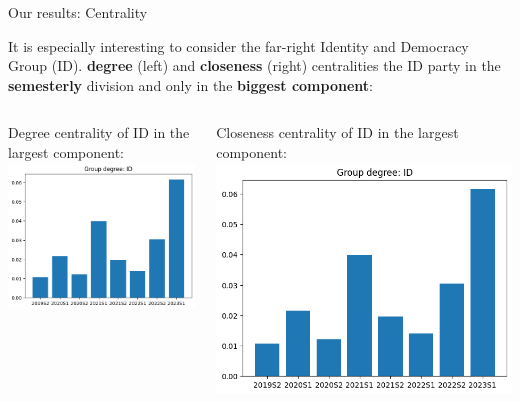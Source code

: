 \documentclass{beamer}
\begin{document}
\begin{frame}{Our results: Centrality}
	
	It is especially interesting to consider the far-right Identity and Democracy Group (ID).
	 \textbf{degree} (left) and \textbf{closeness} (right) centralities the ID party in the \textbf{semesterly} division and only in the \textbf{biggest component}:
	\vspace{4mm}
	\pause
	
\begin{columns}
	\begin{column}{0.5\textwidth}
	Degree centrality of ID in the largest component:
	\\
	\includegraphics[width=\textwidth]{img/ID_HY_deg.png}
	\end{column}
	
	\pause 
	\begin{column}{0.5\textwidth}
	Closeness centrality of ID in the largest component:
	\includegraphics[width=\textwidth]{img/ID_HY_deg.png}
	\end{column}
\end{columns}

\end{frame}
\end{document}
